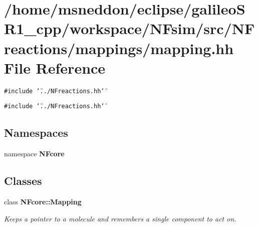 \section{/home/msneddon/eclipse/galileoSR1\_\-cpp/workspace/NFsim/src/NFreactions/mappings/mapping.hh File Reference}
\label{mapping_8hh}


{\tt \#include \char`\"{}../NFreactions.hh\char`\"{}}\par
{\tt \#include \char`\"{}../NFreactions.hh\char`\"{}}\par
\subsection*{Namespaces}
\begin{CompactItemize}
\item 
namespace {\bf NFcore}
\end{CompactItemize}
\subsection*{Classes}
\begin{CompactItemize}
\item 
class {\bf NFcore::Mapping}
\begin{CompactList}\small\item\em Keeps a pointer to a molecule and remembers a single component to act on. \item\end{CompactList}\end{CompactItemize}
